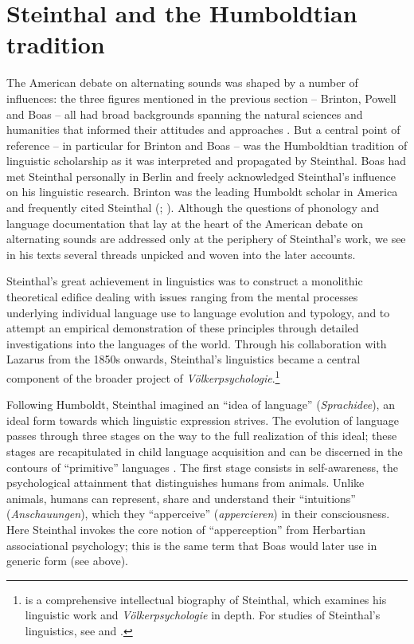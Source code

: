 \documentclass[output=paper]{langscibook}
\begin{document}
\section{Steinthal and the Humboldtian tradition}
\label{sec:mcelvenny:humboldtian}

The American debate on alternating sounds was shaped by a number of influences: the three figures mentioned in the previous section -- Brinton, Powell and Boas -- all had broad backgrounds spanning the natural sciences and humanities that informed their attitudes and approaches \citep[see][]{Darnell1998}. But a central point of reference -- in particular for Brinton and Boas -- was the Humboldtian tradition of linguistic scholarship as it was interpreted and propagated by Steinthal. Boas had met Steinthal personally in Berlin and freely acknowledged Steinthal's influence on his linguistic research. Brinton was the leading Humboldt scholar in America and frequently cited Steinthal (\citealt[see][63--69]{Bunzl1996}; \citealt[289--292]{TrautmannWaller2006}). Although the questions of phonology and language documentation that lay at the heart of the American debate on alternating sounds are addressed only at the periphery of Steinthal's work, we see in his texts several threads unpicked and woven into the later accounts.

Steinthal's great achievement in linguistics was to construct a monolithic theoretical edifice dealing with issues ranging from the mental processes underlying individual language use to language evolution and typology, and to attempt an empirical demonstration of these principles through detailed investigations into the languages of the world. Through his collaboration with Lazarus from the 1850s onwards, Steinthal's linguistics became a central component of the broader project of \emph{Völkerpsychologie}.\footnote{\citet{TrautmannWaller2006} is a comprehensive intellectual biography of Steinthal, which examines his linguistic work and \emph{Völkerpsychologie} in depth. For studies of Steinthal's linguistics, see \citet{Bumann1965} and \citet{Ringmacher1996}.} 

Following Humboldt, Steinthal imagined an ``idea of language'' (\emph{Sprachidee}), an ideal form towards which linguistic expression strives. The evolution of language passes through three stages on the way to the full realization of this ideal; these stages are recapitulated in child language acquisition and can be discerned in the contours of ``primitive'' languages \citep[cf.][81--93]{Bumann1965}. The first stage consists in self-awareness, the psychological attainment that distinguishes humans from animals. Unlike animals, humans can represent, share and understand their ``intuitions'' (\emph{Anschauungen}), which they ``apperceive'' (\emph{appercieren}) in their consciousness. Here Steinthal invokes the core notion of ``apperception'' from Herbartian associational psychology; this is the same term that Boas would later use in generic form (see  above). 
\end{document}
